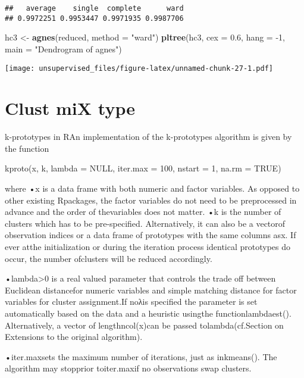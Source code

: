 \documentclass[
]{article}
\newenvironment{Shaded}{\begin{snugshade}}{\end{snugshade}}
\newcommand{\DataTypeTok}[1]{\textcolor[rgb]{0.13,0.29,0.53}{#1}}
\newcommand{\DecValTok}[1]{\textcolor[rgb]{0.00,0.00,0.81}{#1}}
\newcommand{\FloatTok}[1]{\textcolor[rgb]{0.00,0.00,0.81}{#1}}
\newcommand{\KeywordTok}[1]{\textcolor[rgb]{0.13,0.29,0.53}{\textbf{#1}}}
\newcommand{\NormalTok}[1]{#1}
\newcommand{\StringTok}[1]{\textcolor[rgb]{0.31,0.60,0.02}{#1}}
\begin{document}
\begin{verbatim}
##   average    single  complete      ward 
## 0.9972251 0.9953447 0.9971935 0.9987706
\end{verbatim}

\begin{Shaded}
\begin{Highlighting}[]
\NormalTok{hc3 <-}\StringTok{ }\KeywordTok{agnes}\NormalTok{(reduced, }\DataTypeTok{method =} \StringTok{"ward"}\NormalTok{)}
\KeywordTok{pltree}\NormalTok{(hc3, }\DataTypeTok{cex =} \FloatTok{0.6}\NormalTok{, }\DataTypeTok{hang =} \DecValTok{-1}\NormalTok{, }\DataTypeTok{main =} \StringTok{"Dendrogram of agnes"}\NormalTok{) }
\end{Highlighting}
\end{Shaded}

\texttt{[image: unsupervised\_files/figure-latex/unnamed-chunk-27-1.pdf]}

\hypertarget{clust-mix-type}{%
\section{Clust miX type}\label{clust-mix-type}}

k-prototypes in RAn implementation of the k-prototypes algorithm is
given by the function

kproto(x, k, lambda = NULL, iter.max = 100, nstart = 1, na.rm = TRUE)

where •x is a data frame with both numeric and factor variables. As
opposed to other existing Rpackages, the factor variables do not need to
be preprocessed in advance and the order of thevariables does not
matter. •k is the number of clusters which has to be pre-specified.
Alternatively, it can also be a vectorof observation indices or a data
frame of prototypes with the same columns asx. If ever atthe
initialization or during the iteration process identical prototypes do
occur, the number ofclusters will be reduced accordingly.

•lambda\textgreater0 is a real valued parameter that controls the trade
off between Euclidean distancefor numeric variables and simple matching
distance for factor variables for cluster assignment.If noλis specified
the parameter is set automatically based on the data and a heuristic
usingthe functionlambdaest(). Alternatively, a vector of
lengthncol(x)can be passed tolambda(cf.Section on Extensions to the
original algorithm).

•iter.maxsets the maximum number of iterations, just as inkmeans(). The
algorithm may stopprior toiter.maxif no observations swap clusters.
\end{document}
